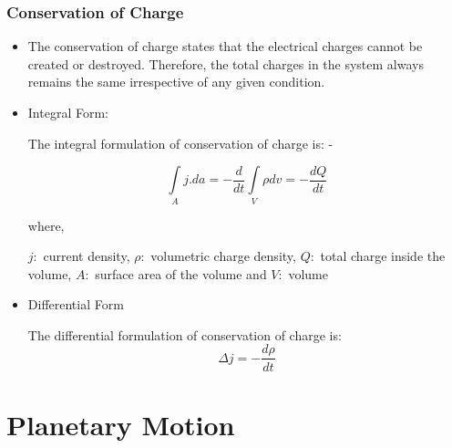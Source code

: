 \documentclass[10pt]{beamer}
\begin{document}
\begin{frame}
    \frametitle{Conservation of Charge}
    \begin{itemize}
        \item The conservation of charge states that the electrical charges cannot be created or destroyed. Therefore, the total charges in the system always remains the same irrespective of any given condition.

        \item Integral Form:

        The integral formulation of conservation of charge is: -

        $$
        \int\limits_A j.da = -\frac {d} {dt} \int\limits_V \rho dv = -\frac {dQ}{dt}
        $$

        where,

        $j:$  current density,
        $\rho:$ volumetric charge density,
        $Q:$  total charge inside the volume,
        $A:$  surface area of the volume and
        $V:$  volume

        \item Differential Form

        The differential formulation of conservation of charge is:
        $$
        \Delta j = -\frac {d\rho}{dt}
        $$
    \end{itemize}
\end{frame}




\section{Planetary Motion}
\end{document}
